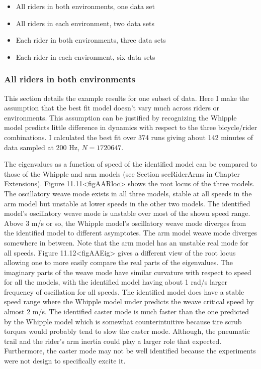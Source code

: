\documentclass[a4paper]{article}
\begin{document}
\begin{itemize}
  \item
    All riders in both environments, one data set
  \item
    All riders in each environment, two data sets
  \item
    Each rider in both environments, three data sets
  \item
    Each rider in each environment, six data sets
\end{itemize}


\subsubsection{All riders in both environments}

This section details the example results for one subset of data. Here I
make the assumption that the best fit model doesn't vary much across
riders or environments. This assumption can be justified by
recognizing the Whipple model predicts little difference in
dynamics with respect to the three bicycle/rider combinations. I
calculated the best fit over 374 runs giving about 142 minutes of data
sampled at 200 Hz, $N=1720647$.

The eigenvalues as a function of speed of the identified model can be
compared to those of the Whipple and arm models (see Section
secRiderArms in Chapter Extensions).
Figure 11.11\textless{}figAARloc\textgreater{} shows the root locus of
the three models. The oscillatory weave mode exists in all three models,
stable at all speeds in the arm model but unstable at lower
speeds in the other two models. The identified model's oscillatory weave
mode is unstable over most of the shown speed range. Above 3 m/s or so,
the Whipple model's oscillatory weave mode diverges from the identified
model to different asymptotes. The arm model weave mode diverges
somewhere in between. Note that the arm model has an unstable real mode
for all speeds. Figure
11.12\textless{}figAAEig\textgreater{} gives a different view of the
root locus allowing one to more easily compare the real parts of the
eigenvalues. The imaginary parts of the weave mode have similar
curvature with respect to speed for all the models, with the identified
model having about 1 rad/s larger frequency of oscillation for all
speeds. The identified model does have a stable speed range where the
Whipple model under predicts the weave critical speed by almost 2 m/s.
The identified caster mode is much faster than the one predicted by the
Whipple model which is somewhat counterintuitive because tire scrub
torques would probably tend to slow the caster mode. Although, the
pneumatic trail and the rider's arm inertia could play a larger role
that expected. Furthermore, the caster mode may not be well identified
because the experiments were not design to specifically excite it.
\end{document}

